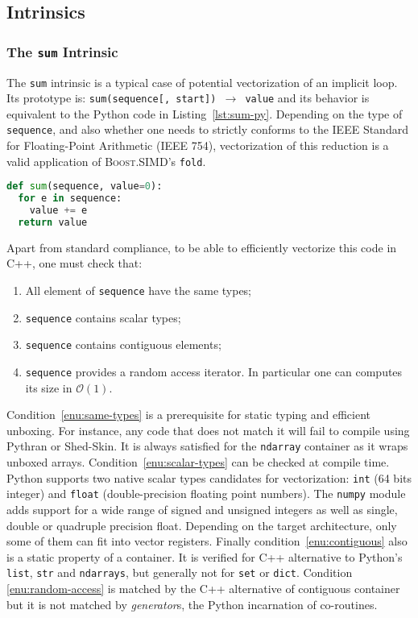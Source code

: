 \documentclass[10pt]{sigplanconf}
\providecommand{\boostsimd}{\textsc{Boost.SIMD}}
\begin{document}
\subsection{Intrinsics}

\subsubsection{The \texttt{sum} Intrinsic}

The \texttt{sum} intrinsic is a typical case of potential vectorization of an
implicit loop. Its prototype is: \texttt{sum(sequence[, start]) $\rightarrow$
value} and its behavior is equivalent to the Python code in
Listing~\ref{lst:sum-py}. Depending on the type of \texttt{sequence}, and also
whether one needs to strictly conforms to the IEEE Standard for Floating-Point
Arithmetic (IEEE 754), vectorization of this reduction is a valid application
of \boostsimd's \texttt{fold}.

\begin{lstlisting}[language=python, label={lst:sum-py}, caption={Pseudo code of the \texttt{sum} intrinsic.}]
def sum(sequence, value=0):
  for e in sequence:
    value += e
  return value
\end{lstlisting}

Apart from standard compliance, to be able to efficiently vectorize this code in C++, one must check that:

\begin{enumerate}
    \item\label{enu:same-types} All element of \texttt{sequence} have the same types;
    \item\label{enu:scalar-types} \texttt{sequence} contains scalar types;
    \item\label{enu:contiguous} \texttt{sequence} contains contiguous elements;
    \item\label{enu:random-access} \texttt{sequence} provides a random access iterator. In particular one can computes its size in $\mathcal{O}(1)$.
\end{enumerate}

Condition~\ref{enu:same-types} is a prerequisite for static typing and efficient
unboxing. For instance, any code that does not match it will fail to compile
using Pythran or Shed-Skin. It is always satisfied for the \texttt{ndarray}
container as it wraps unboxed arrays. Condition~\ref{enu:scalar-types} can be
checked at compile time. Python supports two native scalar types candidates for
vectorization: \texttt{int} (64 bits integer) and \texttt{float}
(double-precision floating point numbers). The \texttt{numpy} module adds support for a
wide range of signed and unsigned integers as well as single, double or
quadruple precision float. Depending on the target architecture, only some of
them can fit into vector registers. Finally condition~\ref{enu:contiguous} also
is a static property of a container. It is verified for C++ alternative to
Python's \texttt{list}, \texttt{str} and \texttt{ndarrays}, but generally not
for \texttt{set} or \texttt{dict}. Condition \ref{enu:random-access} is matched by
the C++ alternative of contiguous container but it is not
matched by \emph{generator}s, the Python incarnation of co-routines.
\end{document}
